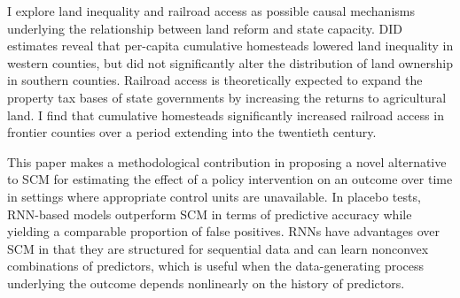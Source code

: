 \documentclass[12pt]{article}
\begin{document}
I explore land inequality and railroad access as possible causal mechanisms underlying the relationship between land reform and state capacity. DID estimates reveal that per-capita cumulative homesteads lowered land inequality in western counties, but did not significantly alter the distribution of land ownership in southern counties. Railroad access is theoretically expected to expand the property tax bases of state governments by increasing the returns to agricultural land. I find that cumulative homesteads significantly increased railroad access in frontier counties over a period extending into the twentieth century. 

This paper makes a methodological contribution in proposing a novel alternative to SCM for estimating the effect of a policy intervention on an outcome over time in settings where appropriate control units are unavailable. In placebo tests, RNN-based models outperform SCM in terms of predictive accuracy while yielding a comparable proportion of false positives. RNNs have advantages over SCM in that they are structured for sequential data and can learn nonconvex combinations of predictors, which is useful when the data-generating process underlying the outcome depends nonlinearly on the history of predictors.%

\newpage


\begin{singlespace}

\end{singlespace}


\itemize
\end{document}
